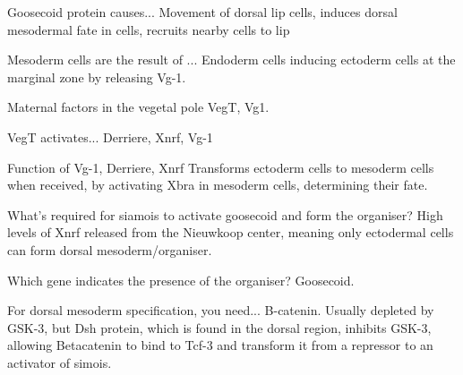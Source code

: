 \begin{flashcard}{Goosecoid protein causes...}
    Movement of dorsal lip cells, induces dorsal mesodermal fate in cells, recruits nearby cells to lip 
\end{flashcard}

\begin{flashcard}{Mesoderm cells are the result of ...}
Endoderm cells inducing ectoderm cells at the marginal zone by releasing Vg-1. 
\end{flashcard}

\begin{flashcard}{Maternal factors in the vegetal pole}
VegT, Vg1.
\end{flashcard}

\begin{flashcard}{VegT activates...}
Derriere, Xnrf, Vg-1
\end{flashcard}

\begin{flashcard}{Function of Vg-1, Derriere, Xnrf}
    Transforms ectoderm cells to mesoderm cells when received, by activating Xbra in mesoderm cells, determining their fate.
\end{flashcard}




\begin{flashcard}[Organiser]{What's required for siamois to activate goosecoid and form the organiser?}
High levels of Xnrf released from the Nieuwkoop center, meaning only ectodermal cells can form dorsal mesoderm/organiser.
\end{flashcard}

\begin{flashcard}[Organiser]{Which gene indicates the presence of the organiser?}
Goosecoid.
\end{flashcard}

\begin{flashcard}[Organiser]{For dorsal mesoderm specification, you need...}
B-catenin. Usually depleted by GSK-3, but Dsh protein, which is found in the dorsal region, inhibits GSK-3, allowing Betacatenin to bind to Tcf-3 and transform it from a repressor to an activator of simois.
\end{flashcard}

